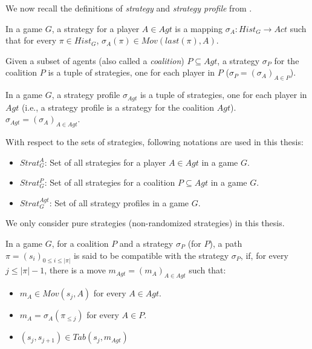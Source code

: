 We now recall the definitions of \textit{strategy} and \textit{strategy profile} from \cite{BBM-concur10,BBM-report}.
 
\begin{definition}
\label{def:strategy}
In a game $G$, a strategy for a player $A \in Agt$ is a mapping $\sigma_{A}: Hist_{G} \rightarrow Act$ such that for every $\pi \in Hist_{G}$, $\sigma_{A}(\pi) \in Mov(last(\pi), A)$.
\end{definition}

Given a subset of agents (also called a \textit{coalition}) $P \subseteq Agt$, a strategy $\sigma_{P}$ for the coalition $P$ is a tuple of strategies, one for each player in $P$ ($\sigma_{P} = (\sigma_{A})_{A\in P}$).

\begin{definition}
In a game $G$, a strategy profile $\sigma_{Agt}$ is a tuple of strategies, one for each player in $Agt$ (i.e., a strategy profile is a strategy for the coalition $Agt$). $\sigma_{Agt} = (\sigma_{A})_{A\in Agt}$.
\end{definition}

With respect to the sets of strategies, following notations are used in this thesis:
\begin{itemize}
\item $Strat^{A}_{G}$: Set of all strategies for a player $A \in Agt$ in a game $G$.
\item $Strat^{P}_{G}$: Set of all strategies for a coalition $P \subseteq Agt$ in a game $G$.
\item $Strat^{Agt}_{G}$: Set of all strategy profiles in a game $G$.
\end{itemize}

\begin{remark}
We only consider pure strategies (non-randomized strategies) in this thesis.
\end{remark}

In a game $G$, for a coalition $P$ and a strategy $\sigma_{P}$ (for $P$), a path $\pi = (s_{i})_{0\leq i\leq \vert \pi \vert}$ is said to be compatible with the strategy $\sigma_{P}$, if, for every $j \leq \vert \pi \vert - 1$, there is a move $m_{Agt} = (m_{A})_{A\in Agt}$ such that:
\begin{itemize}
\item $m_{A} \in Mov(s_{j}, A)$ for every $A \in Agt$.
\item $m_{A} = \sigma_{A}(\pi_{\leq j})$ for every $A \in P$.
\item $(s_{j}, s_{j+1}) \in Tab(s_{j}, m_{Agt})$ 
\end{itemize}

